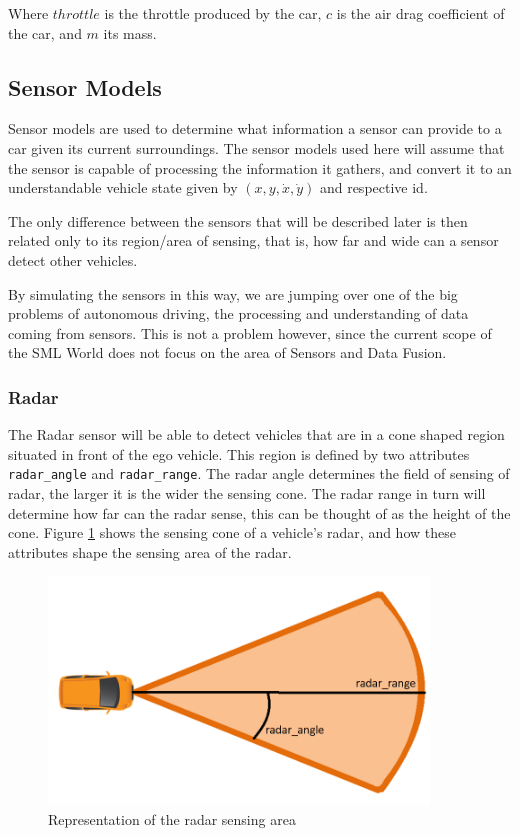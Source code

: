 Where $throttle$ is the throttle produced by the car, $c$ is the air drag coefficient of the car, and $m$ its mass.

\subsection{Sensor Models}
\label{subsec:sensor_models}

Sensor models are used to determine what information a sensor can provide to a car given its current surroundings. The sensor models used here will assume that the sensor is capable of processing the information it gathers, and convert it to an understandable vehicle state given by $(x,y,\dot{x},\dot{y})$ and respective id.

The only difference between the sensors that will be described later is then related only to its region/area of sensing, that is, how far and wide can a sensor detect other vehicles.

By simulating the sensors in this way, we are jumping over one of the big problems of autonomous driving, the processing and understanding of data coming from sensors. This is not a problem however, since the current scope of the SML World does not focus on the area of Sensors and Data Fusion.

\subsubsection{Radar}

The Radar sensor will be able to detect vehicles that are in a cone shaped region situated in front of the ego vehicle. This region is defined by two attributes \texttt{radar\_angle} and \texttt{radar\_range}. The radar angle determines the field of sensing of radar, the larger it is the wider the sensing cone. The radar range in turn will determine how far can the radar sense, this can be thought of as the height of the cone. Figure \ref{fig:radar_sensing_area} shows the sensing cone of a vehicle's radar, and how these attributes shape the sensing area of the radar.

\begin{figure}[h!]
  \centering
    \includegraphics[width=0.9\textwidth]{radar_markings_quantities}
    \caption{Representation of the radar sensing area \label{fig:radar_sensing_area} }
\end{figure}

